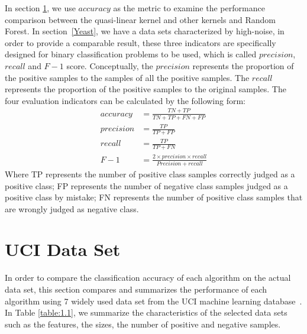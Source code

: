 \documentclass[master]{IPSstyle}
\begin{document}
{In section \ref{UCI}, we use $accuracy$ as the metric to examine the performance comparison between the quasi-linear kernel and other kernels and Random Forest. In section~\ref{Yeast}, we have a data sets characterized by high-noise, in order to provide a comparable result, these three indicators are specifically designed for binary classification problems to be used, which is called $precision$, $recall$ and $F-1$ score. Conceptually, the $precision$ represents the proportion of the positive samples to the samples of all the positive samples. The $recall$ represents the proportion of the positive samples to the original samples. The four evaluation indicators can be calculated by the following form:
\begin{equation}
\begin{aligned}
accuracy &= \frac{TN+TP}{TN+TP+FN+FP} \\
precision &= \frac{TP}{TP + FP} \\
recall &= \frac{TP}{TP + FN} \\
F-1 &=\frac{2 \times precision \times recall}{Precision + recall} 
\end{aligned}
\end{equation}
Where TP represents the number of positive class samples correctly judged as a positive class; FP represents the number of negative class samples judged as a positive class by mistake; FN represents the number of positive class samples that are wrongly judged as negative class. 

\section{UCI Data Set}\label{UCI}
In order to compare the classification accuracy of each algorithm on the actual data set, this section compares and summarizes the performance of each algorithm using 7 widely used data set from the UCI machine learning database~\cite{asuncion2007uci}. In Table \ref{table:1.1}, we summarize the characteristics of the selected data sets such as the features, the sizes,  the number of positive and negative samples. 

}
\end{document}
